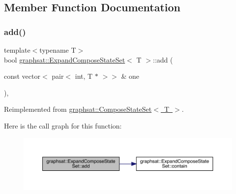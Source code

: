 \subsection{Member Function Documentation}
\mbox{\label{classgraphsat_1_1_expand_compose_state_set_ad56d86ce711a4586fcdaacc7e94d4e18}} 
\subsubsection{\texorpdfstring{add()}{add()}}
{\footnotesize\ttfamily template$<$typename T$>$ \\
bool \mbox{\hyperlink{classgraphsat_1_1_expand_compose_state_set}{graphsat\+::\+Expand\+Compose\+State\+Set}}$<$ T $>$\+::add (\begin{DoxyParamCaption}\item[{const vector$<$ pair$<$ int, T $\ast$ $>$$>$ \&}]{one }\end{DoxyParamCaption})\hspace{0.3cm}{\ttfamily [inline]}, {\ttfamily [virtual]}}



Reimplemented from \mbox{\hyperlink{classgraphsat_1_1_compose_state_set_a0f359257087c8ae10bf25881f9448395}{graphsat\+::\+Compose\+State\+Set$<$ T $>$}}.

Here is the call graph for this function\+:\nopagebreak
\begin{figure}[H]
\begin{center}
\leavevmode
\includegraphics[width=350pt]{classgraphsat_1_1_expand_compose_state_set_ad56d86ce711a4586fcdaacc7e94d4e18_cgraph}
\end{center}
\end{figure}
\mbox{\label{classgraphsat_1_1_expand_compose_state_set_a96584eb485af3dfc9b0115e4d953eb61}} 
